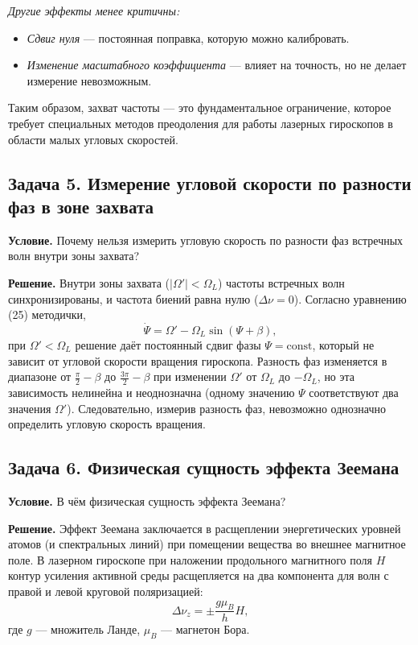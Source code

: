 \documentclass[12pt, a4paper]{article}
\begin{document}
\textit{Другие эффекты менее критичны:}
\begin{itemize}[leftmargin=1.5em]
    \item \textit{Сдвиг нуля} --- постоянная поправка, которую можно калибровать.
    \item \textit{Изменение масштабного коэффициента} --- влияет на точность, но не делает измерение невозможным.
\end{itemize}

Таким образом, захват частоты --- это фундаментальное ограничение, которое требует специальных методов преодоления для работы лазерных гироскопов в области малых угловых скоростей.

\subsection*{Задача 5. Измерение угловой скорости по разности фаз в зоне захвата}

\textbf{Условие.} Почему нельзя измерить угловую скорость по разности фаз встречных волн внутри зоны захвата?

\textbf{Решение.} Внутри зоны захвата ($|\Omega'| < \Omega_L$) частоты встречных волн синхронизированы, и частота биений равна нулю ($\Delta\nu = 0$). Согласно уравнению (25) методички,
\begin{equation}
    \dot{\Psi} = \Omega' - \Omega_L \sin(\Psi + \beta),
\end{equation}
при $\Omega' < \Omega_L$ решение даёт постоянный сдвиг фазы $\Psi = \text{const}$, который не зависит от угловой скорости вращения гироскопа. Разность фаз изменяется в диапазоне от $\frac{\pi}{2} - \beta$ до $\frac{3\pi}{2} - \beta$ при изменении $\Omega'$ от $\Omega_L$ до $-\Omega_L$, но эта зависимость нелинейна и неоднозначна (одному значению $\Psi$ соответствуют два значения $\Omega'$). Следовательно, измерив разность фаз, невозможно однозначно определить угловую скорость вращения.


\subsection*{Задача 6. Физическая сущность эффекта Зеемана}

\textbf{Условие.} В чём физическая сущность эффекта Зеемана?

\textbf{Решение.} Эффект Зеемана заключается в расщеплении энергетических уровней атомов (и спектральных линий) при помещении вещества во внешнее магнитное поле. В лазерном гироскопе при наложении продольного магнитного поля $H$ контур усиления активной среды расщепляется на два компонента для волн с правой и левой круговой поляризацией:
\begin{equation}
    \Delta \nu_z = \pm \frac{g \mu_B}{h} H,
\end{equation}
где $g$ --- множитель Ланде, $\mu_B$ --- магнетон Бора.
\end{document}
